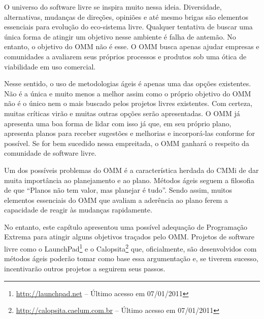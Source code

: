 O universo do software livre se inspira muito nessa
ideia. Diversidade, alternativas, mudanças de direções, opiniões e até
mesmo brigas são elementos essenciais para evolução do eco-sistema
livre. Qualquer tentativa de buscar uma única forma de atingir um
objetivo nesse ambiente é falha de antemão. No entanto, o objetivo do
OMM não é esse. O OMM busca apenas ajudar empresas e comunidades a
avaliarem seus próprios processos e produtos sob uma ótica de
viabilidade em uso comercial.

Nesse sentido, o uso de metodologias ágeis é apenas uma das opções
existentes.  Não é a única e muito menos a melhor assim como o próprio
objetivo do OMM não é o único nem o mais buscado pelos projetos livres
existentes. Com certeza, muitas críticas virão e muitas outras opções
serão apresentadas. O OMM já apresenta uma boa forma de lidar com isso
já que, em seu próprio plano, apresenta planos para receber sugestões
e melhorias e incorporá-las conforme for possível.  Se for bem
sucedido nessa empreitada, o OMM ganhará o respeito da comunidade de
software livre.

Um dos possíveis problemas do OMM é a característica herdada do CMMi
de dar muita importância ao planejamento e ao plano. Métodos ágeis
seguem a filosofia de que ``Planos não tem valor, mas planejar é
tudo''. Sendo assim, muitos elementos essenciais do OMM que avaliam a
aderência ao plano ferem a capacidade de reagir às mudanças
rapidamente.

No entanto, este capítulo apresentou uma possível adequação de
Programação Extrema para atingir alguns objetivos traçados pelo
OMM. Projetos de software livre como o
LaunchPad\footnote{\url{http://launchpad.net} -- Último acesso em
  07/01/2011} e o Calopsita\footnote{\url{http://calopsita.caelum.com.br} --
  Último acesso em 07/01/2011} que, oficialmente, são desenvolvidos
com métodos ágeis poderão tomar como base essa argumentação e, se
tiverem sucesso, incentivarão outros projetos a seguirem seus passos.